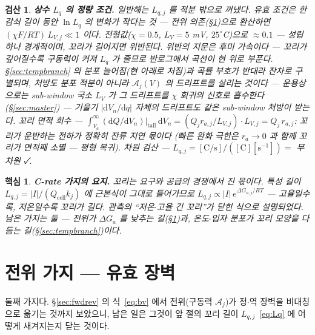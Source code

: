 \documentclass[11pt,a4paper]{article}
\newtheorem*{keybox}{핵심}
\newtheorem*{verifybox}{검산}
\newcommand{\dd}{\mathrm{d}}
\newcommand{\cell}{\mathrm{cell}}
\begin{document}
\begin{verifybox}
\textbf{상수 $L_q$ 의 정량 조건.} 일반해는 $L_{q,j}$ 를 적분 밖으로 꺼냈다. 유효 조건은 한 감쇠 길이
동안 $\ln L_q$ 의 변화가 작다는 것 — 전위 의존(\S\ref{sec:potbranch})으로 환산하면
$(\chi F/RT)\,L_{V,j}\ll1$ 이다. 전형값($\chi=0.5$, $L_V=5$ mV, $25^\circ$C)으로 $\approx0.1$ —
성립하나 경계적이며, 꼬리가 길어지면 위반된다. 위반의 지문은 후미 \emph{가속}이다 — 꼬리가 깊어질수록
구동력이 커져 $L_q$ 가 줄므로 반로그에서 곡선이 현 \emph{위로} 부푼다. \S\ref{sec:tempbranch} 의 분포
늘어짐(현 \emph{아래로} 처짐)과 곡률 부호가 반대라 잔차로 구별되며, 처방도 분포 적분이 아니라
$\mathcal A_j(V)$ 의 드리프트를 살리는 것이다 — 운용상으로는 sub-window 국소 $L_V$ 가 그 드리프트를 $\chi$ 회귀의
신호로 흡수한다(\S\ref{sec:master}) — 기울기 $|\dd V_n/\dd q|$ 자체의 드리프트도 같은
sub-window 처방이 받는다.
꼬리 면적 회수 — $\int_{V_{a}}^{\infty}(\dd Q/\dd V_n)|_{\text{tail}}\,\dd V_n
=(Q_jr_{a,j}/L_{V,j})\cdot L_{V,j}=Q_j\,r_{a,j}$: 꼬리가 운반하는 전하가 정확히 잔류 지연 몫이다
(빠른 완화 극한은 $r_a\to0$ 과 함께 꼬리가 면적째 소멸 — 평형 복귀).
차원 검산 — $L_{q,j}=[\mathrm{C/s}]/([\mathrm C][\mathrm{s^{-1}}])=$ 무차원 ✓.
\end{verifybox}

\begin{keybox}
\textbf{C-rate 가지의 요지.} 꼬리는 요구와 공급의 경쟁에서 진 몫이다. 특성 길이
$L_{q,j}=|I|/(Q_\cell k_j)$ 에 근본식이 그대로 들어가므로 $L_{q,j}\propto|I|\,e^{\Delta G_{a,j}/RT}$ —
고율일수록, 저온일수록 꼬리가 길다. 관측의 ``저온$\cdot$고율 긴 꼬리''가 닫힌 식으로 설명되었다. 남은
가지는 둘 — 전위가 $\Delta G_a$ 를 낮추는 길(\S\ref{sec:potbranch})과, 온도$\cdot$입자 분포가 꼬리
모양을 다듬는 길(\S\ref{sec:tempbranch})이다.
\end{keybox}

\section{전위 가지 — 유효 장벽}\label{sec:potbranch}
둘째 가지다. \S\ref{sec:fwdrev} 의 식~\eqref{eq:bv} 에서 전위(구동력 $\mathcal A_j$)가
정$\cdot$역 장벽을 비대칭으로 옮기는 것까지 보았으니, 남은 일은 그것이 앞 절의 꼬리 길이
$L_{q,j}$~\eqref{eq:Lq} 에 어떻게 새겨지는지 닫는 것이다.
\end{document}
